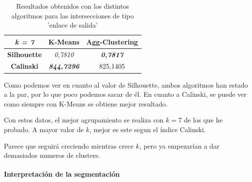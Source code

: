 \begin{table}[H]
\begin{subtable}[H]{0.45\textwidth}
\end{subtable}
\begin{subtable}[H]{0.45\textwidth}
        \centering
\begin{tabular}{|c|c|c|}
\hline
\textit{k = 7}      & \textbf{K-Means}           & \textbf{Agg-Clustering}  \\ \hline
\textbf{Silhouette} & \textit{0,7810}            & \textit{\textbf{0,7817}} \\ \hline
\textbf{Calinski}   & \textit{\textbf{844,7296}} & 825,1405                 \\ \hline
\end{tabular}
\end{subtable}
\hfill
\caption{Resultados obtenidos con los distintos algoritmos para las intersecciones de tipo 'enlace de salida'}
\end{table}


Como podemos ver en cuanto al valor de Silhouette, ambos algoritmos han estado a la par, por lo que poco podemos sacar de él. En cuanto a Calinski, se puede ver como siempre con K-Means se obtiene mejor resultado. 

Con estos datos, el mejor agrupamiento se realiza con $k=7$ de los que he probado. A mayor valor de $k$, mejor es este segun el índice Calinski.

Parece que seguirá creciendo mientras crece $k$, pero ya empezarían a dar demasiados numeros de clusters.


\paragraph{Interpretación de la segmentación}

